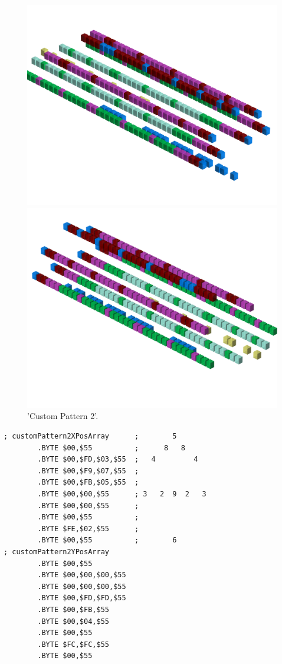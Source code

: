 \begin{figure}[H]
    \centering
    \begin{adjustbox}{width=12cm,center}
      \includegraphics[width=12cm]{src/patterns/pattern10-45.png}%
    \end{adjustbox}
    \begin{adjustbox}{width=12cm,margin=0cm -4cm}
      \includegraphics[width=12cm]{src/patterns/pattern10-225.png}%
    \end{adjustbox}
\caption{'Custom Pattern 2'.}
\end{figure}
\clearpage

\begin{lstlisting}
; customPattern2XPosArray      ;        5       
        .BYTE $00,$55          ;      8   8     
        .BYTE $00,$FD,$03,$55  ;   4         4  
        .BYTE $00,$F9,$07,$55  ;                
        .BYTE $00,$FB,$05,$55  ;                
        .BYTE $00,$00,$55      ; 3   2  9  2   3
        .BYTE $00,$00,$55      ;                
        .BYTE $00,$55          ;                
        .BYTE $FE,$02,$55      ;                
        .BYTE $00,$55          ;        6       
; customPattern2YPosArray
        .BYTE $00,$55
        .BYTE $00,$00,$00,$55
        .BYTE $00,$00,$00,$55
        .BYTE $00,$FD,$FD,$55
        .BYTE $00,$FB,$55
        .BYTE $00,$04,$55
        .BYTE $00,$55
        .BYTE $FC,$FC,$55
        .BYTE $00,$55
\end{lstlisting}


